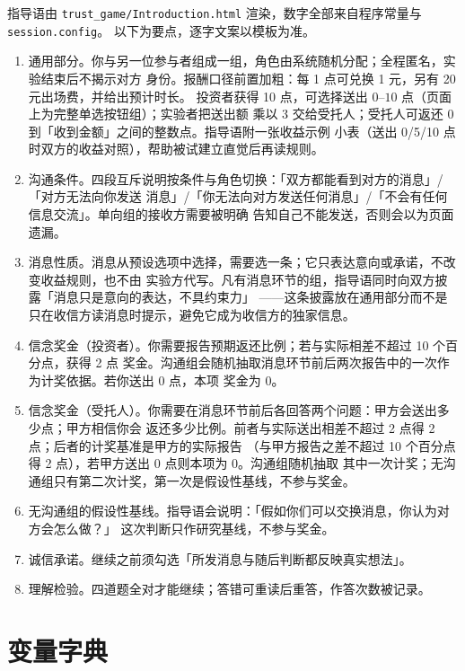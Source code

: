 \documentclass[10pt,a4paper]{ctexart}
\newcommand{\code}[1]{\texttt{#1}}
\begin{document}
指导语由 \code{trust\_game/Introduction.html} 渲染，数字全部来自程序常量与 \code{session.config}。
以下为要点，逐字文案以模板为准。

\begin{enumerate}
  \item 通用部分。你与另一位参与者组成一组，角色由系统随机分配；全程匿名，实验结束后不揭示对方
        身份。报酬口径前置加粗：每 1 点可兑换 1 元，另有 20 元出场费，并给出预计时长。
        投资者获得 10 点，可选择送出 $0$--$10$ 点（页面上为完整单选按钮组）；实验者把送出额
        乘以 3 交给受托人；受托人可返还 $0$ 到「收到金额」之间的整数点。指导语附一张收益示例
        小表（送出 0/5/10 点时双方的收益对照），帮助被试建立直觉后再读规则。
  \item 沟通条件。四段互斥说明按条件与角色切换：「双方都能看到对方的消息」/「对方无法向你发送
        消息」/「你无法向对方发送任何消息」/「不会有任何信息交流」。单向组的接收方需要被明确
        告知自己不能发送，否则会以为页面遗漏。
  \item 消息性质。消息从预设选项中选择，需要选一条；它只表达意向或承诺，不改变收益规则，也不由
        实验方代写。凡有消息环节的组，指导语同时向双方披露「消息只是意向的表达，不具约束力」
        ——这条披露放在通用部分而不是只在收信方读消息时提示，避免它成为收信方的独家信息。
  \item 信念奖金（投资者）。你需要报告预期返还比例；若与实际相差不超过 10 个百分点，获得 2 点
        奖金。沟通组会随机抽取消息环节前后两次报告中的一次作为计奖依据。若你送出 0 点，本项
        奖金为 0。
  \item 信念奖金（受托人）。你需要在消息环节前后各回答两个问题：甲方会送出多少点；甲方相信你会
        返还多少比例。前者与实际送出相差不超过 2 点得 2 点；后者的计奖基准是甲方的实际报告
        （与甲方报告之差不超过 10 个百分点得 2 点），若甲方送出 0 点则本项为 0。沟通组随机抽取
        其中一次计奖；无沟通组只有第二次计奖，第一次是假设性基线，不参与奖金。
  \item 无沟通组的假设性基线。指导语会说明：「假如你们可以交换消息，你认为对方会怎么做？」
        这次判断只作研究基线，不参与奖金。
  \item 诚信承诺。继续之前须勾选「所发消息与随后判断都反映真实想法」。
  \item 理解检验。四道题全对才能继续；答错可重读后重答，作答次数被记录。
\end{enumerate}

\section{变量字典}
\end{document}

